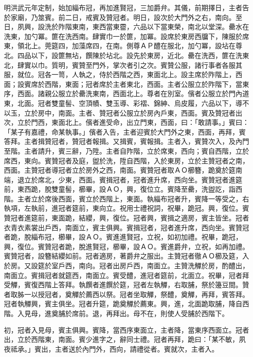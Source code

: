 明洪武元年定制，始加緇布冠，再加進賢冠，三加爵弁。其儀，前期擇日，主者告於家廟，乃筮賓。前二日，戒賓及贊冠者。明日，設次於大門外之右，南向。至日，夙興，設洗於阼階東南，東西當東霤，六品以下當東榮，南北以堂深。罍水在洗東，加勺冪。篚在洗西南。肆實巾一於篚，加冪。設席於東房西牖下，陳服於席東，領北上。莞筵四，加藻席四，在南。側尊ＡＰ醴在服北，加勺冪，設坫在尊北。四品以下，設篚無坫，饌陳於坫北。設先於東房，近北。罍在洗西，篚在洗東北，肆實以巾。質明，賓贊至門外，掌次者引之次。賓贊公服，諸行事者各服其服，就位。冠各一笥，人執之，侍於西階之西，東面北上。設主席於阼階上，西面；設賓席於西階，東面；冠者席於主者東北，西面。主者公服立於阼階下，當東序，西面。諸親公服立於罍洗東南，西面北上。尊者在別室。儐者公服立於門內道東，北面。冠者雙童髻、空頂幘、雙玉導、彩褶、錦紳、烏皮履，六品以下，導不以玉，立於房中，南面。主者、贊冠者公服立於房內戶東，西面。賓及贊冠者出次，立於門西，東面北上。儐者進受命，出立門東，西面，曰：「敢請事。」賓曰：「某子有嘉禮，命某執事。」儐者入告，主者迎賓於大門外之東，西面，再拜，賓答拜。主者揖贊冠者，贊冠者報揖。又揖賓，賓報揖。主者入，賓贊次入，及內門至階。主者請升，賓三辭，乃陞。主者自阼階，立於席東，西向；賓自西階，立於席西，東向。賓贊冠者及庭，盥於洗，陞自西階，入於東房，立於主贊冠者之南，西面。主贊冠者導冠者立於房外之西，南面。賓贊冠者取ＡＯ櫛簪，跪奠於筵南端，退立於席北，少東，西面。賓揖冠者，冠者進升席，西向坐。賓贊冠者進筵前，東西跪，脫雙童髻，櫛畢，設ＡＯ，興，復位立。賓降至罍，洗盥訖，詣西階。主者立於席後西面，賓立於西階上，東面。執緇布冠者升，賓降一等受之，右執項，左執前，進冠者筵前，東向立。祝用士禮祝詞，祝畢，跪冠。興，復位。賓贊冠者進筵前，東面跪，結纓，興，復位。冠者興，賓揖之適房，賓主皆坐。冠者衣青衣素裳出戶西，南面立，賓主俱興。賓揖冠者，冠者進升席，西向坐。賓贊冠者跪，脫緇布冠，櫛畢，設ＡＯ。賓進進賢冠，立祝，如初加禮。祝畢，跪冠，興，復位。賓贊冠者跪，脫進賢冠，櫛畢，設ＡＯ。賓進爵弁，立祝，如再加禮。賓贊冠者，設簪結纓如前。冠者適房，著爵弁之服出。主贊冠者徹ＡＯ櫛及筵，入於房。又設筵於室戶西，南向。冠者出房戶西，南面立。主贊洗觶於房，酌醴出，南面立。賓揖冠者就筵西，南面立。賓受醴，進冠者筵前，北面立。祝畢，冠者拜受觶，賓復西階上答拜。執饌者進饌於筵，冠者左執觶，右取脯，祭於籩豆間。贊者取胏一以授冠者，奠觶於薦西以祭。冠者坐取觶，祭醴，奠觶，再拜，賓答拜。冠者執觶興，賓主俱坐。冠者升筵，跪奠觶於薦東。興，進，北面跪取脯，降自西階。入見母，進奠脯於席前。退，再拜出。母不在，則使人受脯於西階下。

初，冠者入見母，賓主俱興。賓降，當西序東面立，主者降，當東序西面立。冠者出，立於西階東，南面。賓少進字之，辭同士禮。冠者再拜，跪曰：「某不敏，夙夜祗承。」賓出，主者送於內門外，西向，請禮從者。賓就次，主者入。

